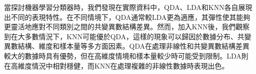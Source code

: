 當探討機器學習分類器時，我們發現在實際資料中，QDA、LDA和KNN各自展現出不同的表現特性。在不同情境下，QDA通常較LDA更為適應，其彈性使其能夠更靈活地應對不同類別之間的共變異數結構差異。然而，加入KNN後，我們觀察到在大多數情況下，KNN可能優於QDA，這樣的現象可以歸因於數據分布、共變異數結構、維度和樣本量等多方面因素。QDA在處理非線性和共變異數結構差異較大的數據時具有優勢，但在高維度情境和樣本量較少時可能受到限制。LDA則在高維度情況中相對穩健，而KNN在處理複雜的非線性數據時表現出色。























